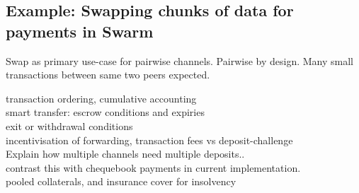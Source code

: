 \subsection{Example: Swapping chunks of data for payments in Swarm}

Swap as primary use-case for pairwise channels. Pairwise by design. Many small transactions between same two peers expected.

transaction ordering, cumulative accounting\\
smart transfer: escrow conditions and expiries\\
exit or withdrawal conditions\\
incentivisation of forwarding, transaction fees vs deposit-challenge\\

Explain how multiple channels need multiple deposits.. \\
contrast this with chequebook payments in current implementation.\\
pooled collaterals, and insurance cover for insolvency
